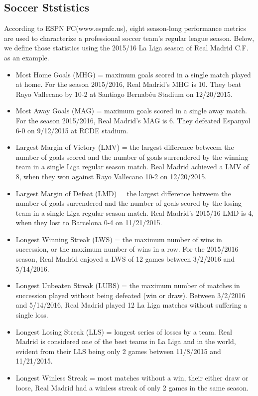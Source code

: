 \documentclass[inte,blindrev]{informs3}
\begin{document}
\subsection*{Soccer Ststistics}
According to ESPN FC(www.espnfc.us), eight season-long performance metrics are used to characterize a professional soccer team's regular league season. Below, we define those statistics using the 2015/16 La Liga season of Real Madrid C.F. as an example.
\begin{itemize}
\item Most Home Goals (MHG) = maximum goals scored in a single match played at home. For the season 2015/2016, Real Madrid’s MHG is 10. They beat Rayo Vallecano by 10-2 at Santiago Bernabéu Stadium on 12/20/2015.
\item Most Away Goals (MAG) = maximum goals scored in a single away match. For the season 2015/2016, Real Madrid’s MAG is 6. They defeated Espanyol 6-0 on 9/12/2015 at RCDE stadium.
\item Largest Margin of Victory (LMV) = the largest difference betweem the number of goals scored and the number of goals surrendered by the winning team in a single Liga regular season match. Real Madrid achieved a LMV of 8, when they won against Rayo Vallecano 10-2 on 12/20/2015.
\item Largest Margin of Defeat (LMD) = the largest difference betweem the number of goals surrendered and the number of goals scored by the losing team in a single Liga regular season match. Real Madrid's 2015/16 LMD is 4, when they lost to Barcelona 0-4 on 11/21/2015.
\item Longest Winning Streak (LWS) = the maximum number of wins in succession, or the maximum number of wins in a row. For the 2015/2016 season, Real Madrid enjoyed a LWS of 12 games between 3/2/2016 and 5/14/2016.
\item Longest Unbeaten Streak (LUBS) = the maximum number of matches in succession played without being defeated (win or draw). Between 3/2/2016 and 5/14/2016, Real Madrid played 12 La Liga matches without suffering a single loss.
\item Longest Losing Streak (LLS) = longest series of losses by a team. Real Madrid is considered one of the best teams in La Liga and in the world, evident from their LLS being only 2 games between 11/8/2015 and 11/21/2015.
\item Longest Winless Streak = most matches without a win, their either draw or loose, Real Madrid had a winless streak of only 2 games in the same season.
\end{itemize} 
\end{document}
